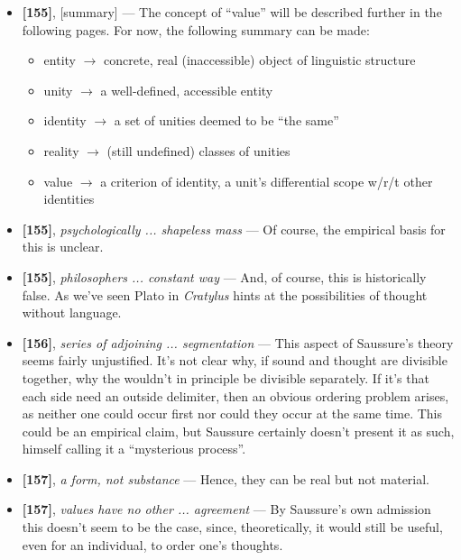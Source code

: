 \documentclass[12pt]{article}
\begin{document}
\begin{itemize}

\item \textbf{[155]}, [summary] --- The concept of ``value'' will be described further in the following pages. For now, the following summary can be made:
    \begin{itemize}
    \item entity $\rightarrow$ concrete, real (inaccessible) object of linguistic structure
    \item unity $\rightarrow$ a well-defined, accessible entity
    \item identity $\rightarrow$ a set of unities deemed to be ``the same''
    \item reality $\rightarrow$ (still undefined) classes of unities
    \item value $\rightarrow$ a criterion of identity, a unit's differential scope w/r/t other identities
    \end{itemize}

\item \textbf{[155]}, \textit{psychologically ... shapeless mass} --- Of course, the empirical basis for this is unclear.

\item \textbf{[155]}, \textit{philosophers  ... constant way} --- And, of course, this is historically false. As we've seen Plato in \textit{Cratylus} hints at the possibilities of thought without language.

\item \textbf{[156]}, \textit{series of adjoining ... segmentation} --- This aspect of Saussure's theory seems fairly unjustified. It's not clear why, if sound and thought are divisible together, why the wouldn't in principle be divisible separately. If it's that each side need an outside delimiter, then an obvious ordering problem arises, as neither one could occur first nor could they occur at the same time. This could be an empirical claim, but Saussure certainly doesn't present it as such, himself calling it a ``mysterious process''.

\item \textbf{[157]}, \textit{a form, not substance} --- Hence, they can be real but not material.

\item \textbf{[157]}, \textit{values have no other ... agreement} --- By Saussure's own admission this doesn't seem to be the case, since, theoretically, it would still be useful, even for an individual, to order one's thoughts.


\end{itemize}
\end{document}
